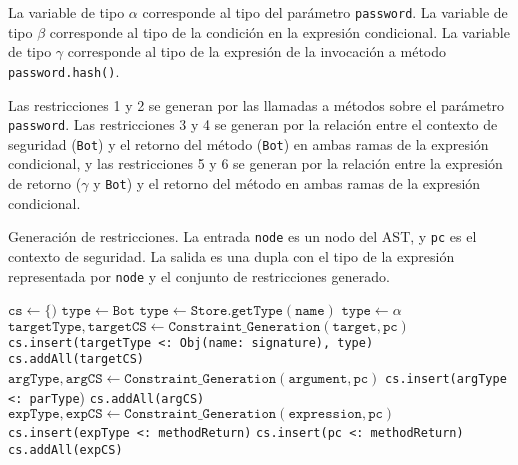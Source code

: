 La variable de tipo $\alpha$ corresponde al tipo del parámetro \texttt{password}. La variable de tipo $\beta$ corresponde al tipo de la condición en la expresión condicional. La variable de tipo $\gamma$ corresponde al tipo de la expresión de la invocación a método \texttt{password.hash()}.

Las restricciones 1 y 2 se generan por las llamadas a métodos sobre el parámetro \texttt{password}. Las restricciones 3 y 4 se generan por la relación entre el contexto de seguridad (\texttt{Bot}) y el retorno del método (\texttt{Bot}) en ambas ramas de la expresión condicional, y las restricciones 5 y 6 se generan por la relación entre la expresión de retorno ($\gamma$ y \texttt{Bot}) y el retorno del método en ambas ramas de la expresión condicional.
\clearpage
\begin{algorithm}\captionsetup{labelsep=newline}
  \centering
  \caption{Generación de restricciones. La entrada \texttt{node} es un nodo del AST, y \texttt{pc} es el contexto de seguridad. La salida es una dupla con el tipo de la expresión representada por \texttt{node} y el conjunto de restricciones generado.}
  \label{pseudogen}
    \begin{algorithmic}[1]
          \State $\mathtt{cs\gets \{)}$
          \State $\mathtt{type\gets Bot}$
              \State $\mathtt{type\gets Store.getType(name)}$
            \EndCase
              \State $\mathtt{type\gets \alpha}$ \label{lineTVar}
              \State $\mathtt{targetType, targetCS\gets Constraint\_Generation(target, pc)}$ \label{lineAss}
              \State \texttt{cs.insert(targetType <: Obj(name: signature), type)}
              \State \texttt{cs.addAll(targetCS)}
                \State $\mathtt{argType, argCS\gets Constraint\_Generation(argument, pc)}$
                \State \texttt{cs.insert(argType <: parType})
                \State \texttt{cs.addAll(argCS)}
              \EndFor
            \EndCase
              \State $\mathtt{expType, expCS\gets Constraint\_Generation(expression, pc)}$
              \State \texttt{cs.insert(expType <: methodReturn)}
              \State \texttt{cs.insert(pc <: methodReturn)}
              \State \texttt{cs.addAll(expCS)}
            \EndCase

\end{algorithmic}
\end{algorithm}
